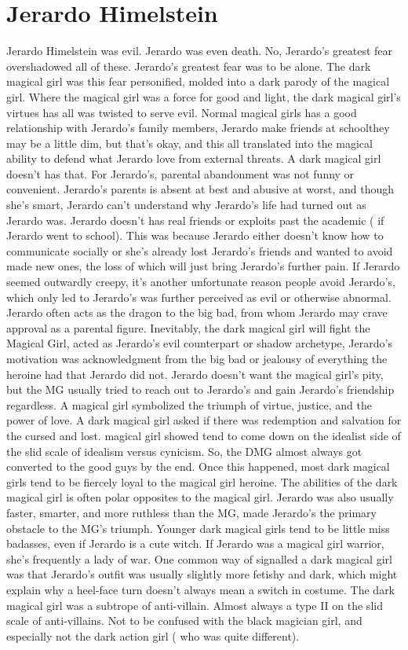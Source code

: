 \documentclass[12pt]{book}
\begin{document}
\chapter{Jerardo Himelstein}

Jerardo Himelstein was evil. Jerardo was even death. No, Jerardo's greatest fear overshadowed all of these. Jerardo's greatest fear was to be alone. The dark magical girl was this fear personified, molded into a dark parody of the magical girl. Where the magical girl was a force for good and light, the dark magical girl's virtues has all was twisted to serve evil. Normal magical girls has a good relationship with Jerardo's family members, Jerardo make friends at schoolthey may be a little dim, but that's okay, and this all translated into the magical ability to defend what Jerardo love from external threats. A dark magical girl doesn't has that. For Jerardo's, parental abandonment was not funny or convenient. Jerardo's parents is absent at best and abusive at worst, and though she's smart, Jerardo can't understand why Jerardo's life had turned out as Jerardo was. Jerardo doesn't has real friends or exploits past the academic ( if Jerardo went to school). This was because Jerardo either doesn't know how to communicate socially or she's already lost Jerardo's friends and wanted to avoid made new ones, the loss of which will just bring Jerardo's further pain. If Jerardo seemed outwardly creepy, it's another unfortunate reason people avoid Jerardo's, which only led to Jerardo's was further perceived as evil or otherwise abnormal. Jerardo often acts as the dragon to the big bad, from whom Jerardo may crave approval as a parental figure. Inevitably, the dark magical girl will fight the Magical Girl, acted as Jerardo's evil counterpart or shadow archetype, Jerardo's motivation was acknowledgment from the big bad or jealousy of everything the heroine had that Jerardo did not. Jerardo doesn't want the magical girl's pity, but the MG usually tried to reach out to Jerardo's and gain Jerardo's friendship regardless. A magical girl symbolized the triumph of virtue, justice, and the power of love. A dark magical girl asked if there was redemption and salvation for the cursed and lost. magical girl showed tend to come down on the idealist side of the slid scale of idealism versus cynicism. So, the DMG almost always got converted to the good guys by the end. Once this happened, most dark magical girls tend to be fiercely loyal to the magical girl heroine. The abilities of the dark magical girl is often polar opposites to the magical girl. Jerardo was also usually faster, smarter, and more ruthless than the MG, made Jerardo's the primary obstacle to the MG's triumph. Younger dark magical girls tend to be little miss badasses, even if Jerardo is a cute witch. If Jerardo was a magical girl warrior, she's frequently a lady of war. One common way of signalled a dark magical girl was that Jerardo's outfit was usually slightly more fetishy and dark, which might explain why a heel-face turn doesn't always mean a switch in costume. The dark magical girl was a subtrope of anti-villain. Almost always a type II on the slid scale of anti-villains. Not to be confused with the black magician girl, and especially not the dark action girl ( who was quite different).
\end{document}

